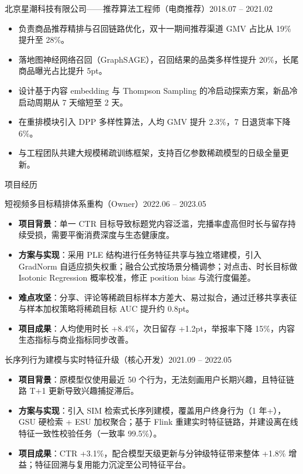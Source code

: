\documentclass[10.5pt,fontset=windows]{ctexart}
\newcommand{\rsection}[1]{%
  \Needspace*{6\baselineskip}%
  \vspace{9pt}%
  {\color{maincolor}\heiti\zihao{4}#1}\par
  \vspace{1pt}{\color{maincolor}\rule{\textwidth}{1pt}}\par
  \vspace{3pt}}
\newcommand{\entryhead}[2]{%
  \Needspace*{3\baselineskip}%
  {\heiti #1}\hfill{\color{graytext}\small #2}\par\vspace{1pt}}
\begin{document}
\entryhead{北京星潮科技有限公司\quad ——\quad 推荐算法工程师（电商推荐）}{2018.07 -- 2021.02}
\begin{itemize}
  \item 负责商品推荐精排与召回链路优化，双十一期间推荐渠道 GMV 占比从 19\% 提升至 28\%。
  \item 落地图神经网络召回（GraphSAGE），召回结果的品类多样性提升 20\%，长尾商品曝光占比提升 5pt。
  \item 设计基于内容 embedding 与 Thompson Sampling 的冷启动探索方案，新品冷启动周期从 7 天缩短至 2 天。
  \item 在重排模块引入 DPP 多样性算法，人均 GMV 提升 2.3\%，7 日退货率下降 6\%。
  \item 与工程团队共建大规模稀疏训练框架，支持百亿参数稀疏模型的日级全量更新。
\end{itemize}

\rsection{项目经历}

\entryhead{短视频多目标精排体系重构（Owner）}{2022.06 -- 2023.05}
\begin{itemize}
  \item \textbf{项目背景}：单一 CTR 目标导致标题党内容泛滥，完播率虚高但时长与留存持续受损，需要平衡消费深度与生态健康度。
  \item \textbf{方案与实现}：采用 PLE 结构进行任务特征共享与独立塔建模，引入 GradNorm 自适应损失权重；融合公式按场景分桶调参；对点击、时长目标做 Isotonic Regression 概率校准，修正 position bias 与流行度偏差。
  \item \textbf{难点攻坚}：分享、评论等稀疏目标样本方差大、易过拟合，通过迁移共享表征与样本加权策略将稀疏目标 AUC 提升约 0.8pt。
  \item \textbf{项目成果}：人均使用时长 +8.4\%，次日留存 +1.2pt，举报率下降 15\%，内容生态指标与商业指标同步改善。
\end{itemize}

\entryhead{长序列行为建模与实时特征升级（核心开发）}{2021.09 -- 2022.05}
\begin{itemize}
  \item \textbf{项目背景}：原模型仅使用最近 50 个行为，无法刻画用户长期兴趣，且特征链路 T+1 更新导致兴趣捕捉滞后。
  \item \textbf{方案与实现}：引入 SIM 检索式长序列建模，覆盖用户终身行为（1 年+），GSU 硬检索 + ESU 加权聚合；基于 Flink 重建实时特征链路，并建设离在线特征一致性校验任务（一致率 99.5\%）。
  \item \textbf{项目成果}：CTR +3.1\%，配合模型天级更新与分钟级特征带来整体 +1.8\% 增益；特征回溯与复用能力沉淀至公司特征平台。
\end{itemize}
\end{document}
